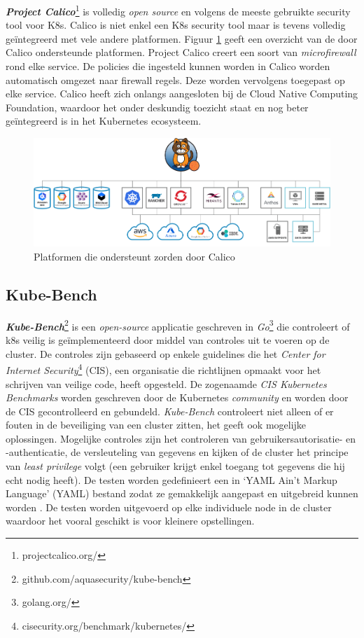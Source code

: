 \textbf{\textit{Project Calico}}\footnote{projectcalico.org/} is volledig \textit{open source} en volgens \textcite{Armstrong2021} de meeste gebruikte security tool voor K8s. Calico is niet enkel een K8s security tool maar is tevens volledig geïntegreerd met vele andere platformen. Figuur \ref{fig:CalicaEco} geeft een overzicht van de door Calico ondersteunde platformen. Project Calico creert een soort van \textit{microfirewall} rond elke service. De policies die ingesteld kunnen worden in Calico worden automatisch omgezet naar firewall regels. Deze worden vervolgens toegepast op elke service. Calico heeft zich onlangs aangesloten bij de Cloud Native Computing Foundation, waardoor het onder deskundig toezicht staat en nog beter geïntegreerd is in het Kubernetes ecosysteem.
\begin{figure}[ht]
    \centering
    \includegraphics[width=\linewidth]{img/Calico-Ecosystem.png}
    \caption{Platformen die ondersteunt zorden door Calico \autocite{Tigera2021}}
    \label{fig:CalicaEco}
\end{figure}

\subsection{Kube-Bench} \label{bench}
\textbf{\textit{Kube-Bench}}\footnote{github.com/aquasecurity/kube-bench} is een \textit{open-source} applicatie geschreven in \textit{Go}\footnote{golang.org/} die controleert of k8s veilig is geïmplementeerd door middel van controles uit te voeren op de cluster. De controles zijn gebaseerd op enkele guidelines die het \textit{Center for Internet Security}\footnote{cisecurity.org/benchmark/kubernetes/} (CIS), een organisatie die richtlijnen opmaakt voor het schrijven van veilige code, heeft opgesteld. De zogenaamde \textit{CIS Kubernetes Benchmarks} worden geschreven door de Kubernetes \textit{community} en worden door de CIS gecontrolleerd en gebundeld. \textit{Kube-Bench} controleert niet alleen of er fouten in de beveiliging van een cluster zitten, het geeft ook mogelijke oplossingen. Mogelijke controles zijn het controleren van gebruikersautorisatie- en -authenticatie, de versleuteling van gegevens en kijken of de cluster het principe van \textit{least privilege} volgt (een gebruiker krijgt enkel toegang tot gegevens die hij echt nodig heeft). De testen worden gedefinieert een in `YAML Ain't Markup Language' (YAML) bestand zodat ze gemakkelijk aangepast en uitgebreid kunnen worden \autocite{Rice2021}. De testen worden uitgevoerd op elke individuele node in de cluster waardoor het vooral geschikt is voor kleinere opstellingen.

